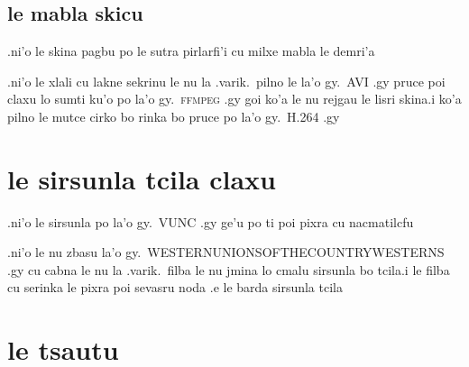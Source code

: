 \documentclass{report}
\begin{document}
\subsection{le mabla skicu}
.ni'o le skina pagbu po le sutra pirlarfi'i cu milxe mabla le demri'a

.ni'o le xlali cu lakne sekrinu le nu la .varik.\ pilno le la'o gy.\ AVI .gy pruce poi claxu lo sumti ku'o po la'o gy.\ \textsc{ffmpeg} .gy goi ko'a le nu rejgau le lisri skina\@  .i ko'a pilno le mutce cirko bo rinka bo pruce po la'o gy.\ H.264 .gy
\section{le sirsunla tcila claxu}
.ni'o le sirsunla po la'o gy.\ VUNC .gy ge'u po ti poi pixra cu nacmatilcfu

.ni'o le nu zbasu la'o gy.\ WESTERNUNIONSOFTHECOUNTRYWESTERNS .gy cu cabna le nu la .varik.\ filba le nu jmina lo cmalu sirsunla bo tcila\@  .i le filba cu serinka le pixra poi sevasru noda .e le barda sirsunla tcila
\section{le tsautu}
\end{document}
